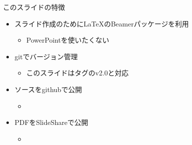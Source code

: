\begin{frame}{このスライドの特徴}
 \begin{itemize}
  \item スライド作成のために\LaTeX のBeamerパッケージを利用
        \begin{itemize}
         \item PowerPointを使いたくない
        \end{itemize}
  \item gitでバージョン管理
        \begin{itemize}
         \item このスライドはタグのv2.0と対応
        \end{itemize}
  \item ソースをgithubで公開
\begin{itemize}
 \item \href{https://github.com/sakabar/prml_titech_2-3-1_2-3-7}{}
\end{itemize}
  \item PDFをSlideShareで公開
\begin{itemize}
 \item \href{http://www.slideshare.net/takafumisakakibara75/slide-41820194}{}
\end{itemize}

 \end{itemize}
\end{frame}
